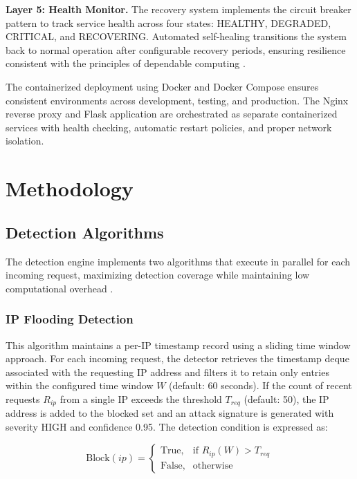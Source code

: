 \documentclass[conference]{IEEEtran}
\begin{document}
\textbf{Layer 5: Health Monitor.} The recovery system implements the circuit breaker pattern \cite{b9} to track service health across four states: HEALTHY, DEGRADED, CRITICAL, and RECOVERING. Automated self-healing transitions the system back to normal operation after configurable recovery periods, ensuring resilience consistent with the principles of dependable computing \cite{b17}.

The containerized deployment using Docker \cite{b23} and Docker Compose ensures consistent environments across development, testing, and production. The Nginx reverse proxy and Flask application are orchestrated as separate containerized services with health checking, automatic restart policies, and proper network isolation.

\section{Methodology}

\subsection{Detection Algorithms}

The detection engine implements two algorithms that execute in parallel for each incoming request, maximizing detection coverage while maintaining low computational overhead \cite{b12}.

\subsubsection{IP Flooding Detection}
This algorithm maintains a per-IP timestamp record using a sliding time window approach. For each incoming request, the detector retrieves the timestamp deque associated with the requesting IP address and filters it to retain only entries within the configured time window $W$ (default: 60 seconds). If the count of recent requests $R_{ip}$ from a single IP exceeds the threshold $T_{req}$ (default: 50), the IP address is added to the blocked set and an attack signature is generated with severity HIGH and confidence 0.95. The detection condition is expressed as:

\begin{equation}
\text{Block}(ip) =
\begin{cases}
\text{True}, & \text{if } R_{ip}(W) > T_{req} \\
\text{False}, & \text{otherwise}
\end{cases}
\label{eq_flood}
\end{equation}
\end{document}
